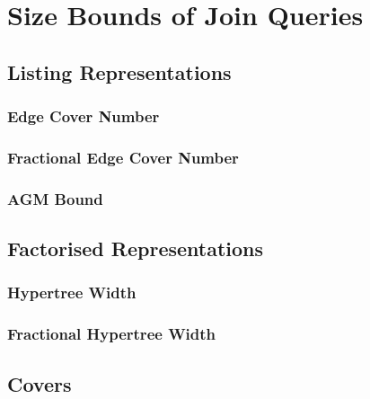 \chapter{Size Bounds of Join Queries}

\section{Listing Representations}

\subsection{Edge Cover Number}
\subsection{Fractional Edge Cover Number}
\subsection{AGM Bound}

\section{Factorised Representations}

\subsection{Hypertree Width}
\subsection{Fractional Hypertree Width}

\section{Covers}



